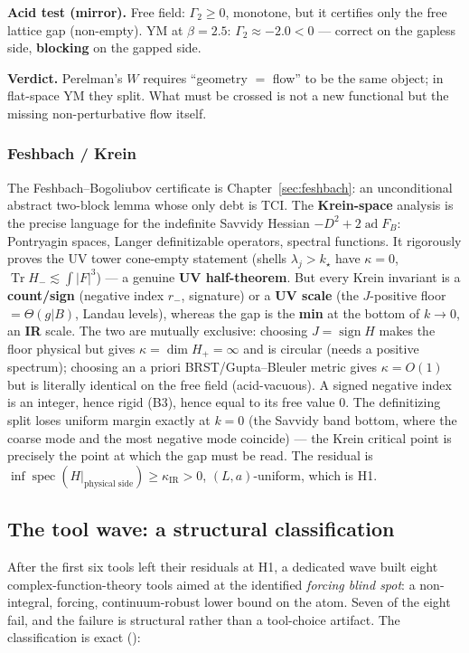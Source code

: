 \textbf{Acid test (mirror).} Free field: $\Gamma_2\ge0$, monotone, but it certifies only the free
lattice gap (non-empty). YM at $\beta=2.5$: $\Gamma_2\approx-2.0<0$ --- correct on the gapless
side, \textbf{blocking} on the gapped side.

\textbf{Verdict.} Perelman's $W$ requires ``geometry $=$ flow'' to be the same object; in
flat-space YM they split. What must be crossed is not a new functional but the missing
non-perturbative flow itself.

\subsubsection{Feshbach / Krein}

The Feshbach--Bogoliubov certificate is Chapter~\ref{sec:feshbach}: an unconditional abstract
two-block lemma whose only debt is TCI. The \textbf{Krein-space} analysis is the precise language
for the indefinite Savvidy Hessian $-D^2+2\operatorname{ad}F_B$: Pontryagin spaces, Langer
definitizable operators, spectral functions. It rigorously proves the UV tower cone-empty
statement (shells $\lambda_j>k_\star$ have $\kappa=0$, $\operatorname{Tr}H_-\lesssim\int|F|^3$)
--- a genuine \textbf{UV half-theorem}. But every Krein invariant is a \textbf{count/sign}
(negative index $r_-$, signature) or a \textbf{UV scale} (the $J$-positive floor
$=\Theta(g|B)$, Landau levels), whereas the gap is the \textbf{min} at the bottom of $k\to0$, an
\textbf{IR} scale. The two are mutually exclusive: choosing $J=\operatorname{sign}H$ makes the
floor physical but gives $\kappa=\dim H_+=\infty$ and is circular (needs a positive spectrum);
choosing an a priori BRST/Gupta--Bleuler metric gives $\kappa=O(1)$ but is literally identical on
the free field (acid-vacuous). A signed negative index is an integer, hence rigid (B3), hence
equal to its free value $0$. The definitizing split loses uniform margin exactly at $k=0$ (the
Savvidy band bottom, where the coarse mode and the most negative mode coincide) --- the Krein
critical point is precisely the point at which the gap must be read. The residual is
$\inf\operatorname{spec}(H|_{\text{physical side}})\ge\kappa_{\mathrm{IR}}>0$, $(L,a)$-uniform,
which is H1.

\subsection{The tool wave: a structural classification}

After the first six tools left their residuals at H1, a dedicated wave built eight
complex-function-theory tools aimed at the identified \emph{forcing blind spot}: a non-integral,
forcing, continuum-robust lower bound on the atom. Seven of the eight fail, and the failure is
structural rather than a tool-choice artifact. The classification is exact
():


